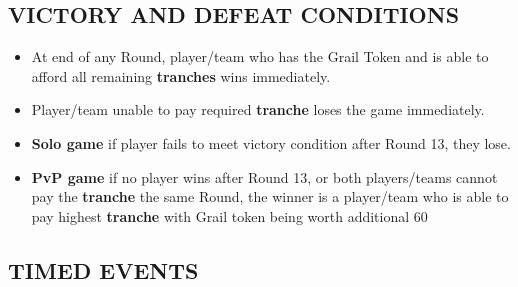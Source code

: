 \begin{multicols*}{2}
    \subsection*{\MakeUppercase{Victory and Defeat Conditions}}

    \begin{itemize}
        \item At end of any Round, player/team who has the Grail Token and is able to afford all remaining \textbf{tranches} wins immediately.
        \item Player/team unable to pay required \textbf{tranche} loses the game immediately.
        \item \textbf{Solo game} if player fails to meet victory condition after Round 13, they lose.
        \item \textbf{PvP game} if no player wins after Round 13, or both players/teams cannot pay the \textbf{tranche} the same Round, the winner is a player/team who is able to pay highest \textbf{tranche} with Grail token being worth additional 60 
    \end{itemize}

    \vfill

    \subsection*{\MakeUppercase{Timed Events}}

    \begin{table*}[b!]
    \end{table*}


\end{multicols*}

